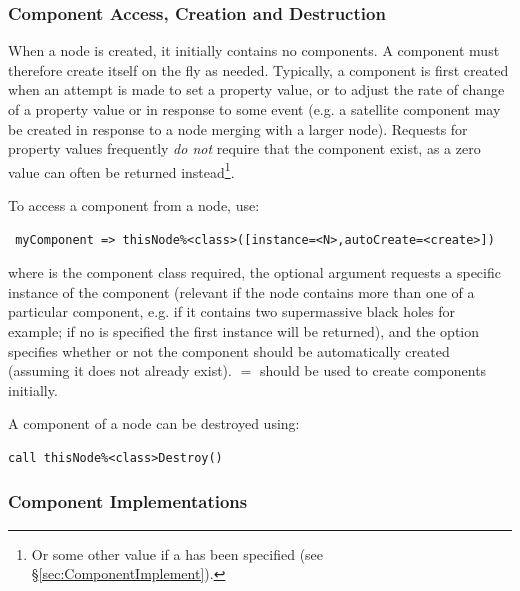\subsubsection{Component Access, Creation and Destruction}

When a node is created, it initially contains no components. A component must therefore create itself on the fly as needed. Typically, a component is first created when an attempt is made to set a property value, or to adjust the rate of change of a property value or in response to some event (e.g. a satellite component may be created in response to a node merging with a larger node). Requests for property values frequently \emph{do not} require that the component exist, as a zero value can often be returned instead\footnote{Or some other value if a  has been specified (see \S\ref{sec:ComponentImplement}).}.

To access a component from a node, use:
\begin{verbatim}
 myComponent => thisNode%<class>([instance=<N>,autoCreate=<create>])
\end{verbatim}
where  is the component class required, the optional  argument requests a specific instance of the component (relevant if the node contains more than one of a particular component, e.g. if it contains two supermassive black holes for example; if no  is specified the first instance will be returned), and the  option specifies whether or not the component should be automatically created (assuming it does not already exist). $=$ should be used to create components initially.

A component of a node can be destroyed using:
\begin{verbatim}
call thisNode%<class>Destroy()
\end{verbatim}

\subsubsection{Component Implementations}\label{sec:ComponentMethods}


